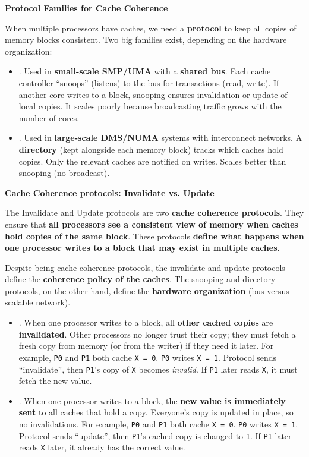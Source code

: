 \highspace
\begin{flushleft}
    \textcolor{Green3}{ \textbf{Protocol Families for Cache Coherence}}
\end{flushleft}
When multiple processors have caches, we need a \textbf{protocol} to keep all copies of memory blocks consistent. Two big families exist, depending on the hardware organization:
\begin{itemize}
    \item {}. Used in \textbf{small-scale SMP/UMA} with a \textbf{shared bus}. Each cache controller ``snoops'' (listens) to the bus for transactions (read, write). If another core writes to a block, snooping ensures invalidation or update of local copies. It scales poorly because broadcasting traffic grows with the number of cores.
    \item {}. Used in \textbf{large-scale DMS/NUMA} systems with interconnect networks. A \textbf{directory} (kept alongside each memory block) tracks which caches hold copies. Only the relevant caches are notified on writes. Scales better than snooping (no broadcast).
\end{itemize}

\highspace
\begin{flushleft}
    \textcolor{Green3}{ \textbf{Cache Coherence protocols: Invalidate vs. Update}}
\end{flushleft}
The Invalidate and Update protocols are two \textbf{cache coherence protocols}. They ensure that \textbf{all processors see a consistent view of memory when caches hold copies of the same block}. These protocols \textbf{define what happens when one processor writes to a block that may exist in multiple caches}.

\highspace
Despite being cache coherence protocols, the invalidate and update protocols define the \textbf{coherence policy of the caches}. The snooping and directory protocols, on the other hand, define the \textbf{hardware organization} (bus versus scalable network).
\begin{itemize}
    \item {}. When one processor writes to a block, all \textbf{other cached copies} are \textbf{invalidated}. Other processors no longer trust their copy; they must fetch a fresh copy from memory (or from the writer) if they need it later. For example, \texttt{P0} and \texttt{P1} both cache \texttt{X = 0}. \texttt{P0} writes \texttt{X = 1}. Protocol sends ``invalidate'', then \texttt{P1}'s copy of \texttt{X} becomes \emph{invalid}. If \texttt{P1} later reads \texttt{X}, it must fetch the new value.
    \item {}. When one processor writes to a block, the \textbf{new value is immediately sent} to all caches that hold a copy. Everyone's copy is updated in place, so no invalidations. For example, \texttt{P0} and \texttt{P1} both cache \texttt{X = 0}. \texttt{P0} writes \texttt{X = 1}. Protocol sends ``update'', then \texttt{P1}'s cached copy is changed to \texttt{1}. If \texttt{P1} later reads \texttt{X} later, it already has the correct value.
\end{itemize}